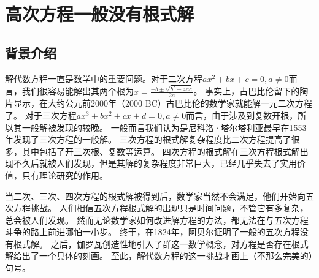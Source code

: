 \documentclass[main]{subfiles}
\begin{document}
\renewcommand{\filename}{No.9Theorem}%
\section{高次方程一般没有根式解}
\subsection{背景介绍}
解代数方程一直是数学中的重要问题。对于二次方程\(ax^2+bx+c=0,a \neq 0\)而言，我们很容易能解出其两个根为\(x= \frac{-b \pm \sqrt{b^2-4ac}}{2a}\)。
事实上，古巴比伦留下的陶片显示，在大约公元前2000年（2000 BC）古巴比伦的数学家就能解一元二次方程了。
对于三次方程\(ax^3+bx^2+cx+d=0,a \neq 0\)而言，由于涉及到复数开根，所以其一般解被发现的较晚。
一般而言我们认为是尼科洛·塔尔塔利亚最早在1553年发现了三次方程的一般解。
三次方程的根式解复杂程度比二次方程提高了很多，其中包括了开三次根、复数等运算。
四次方程的根式解在三次方程根式解出现不久后就被人们发现，但是其解的复杂程度非常巨大，已经几乎失去了实用价值，只有理论研究的作用。

当二次、三次、四次方程的根式解被得到后，数学家当然不会满足，他们开始向五次方程挑战。
人们相信五次方程根式解的出现只是时间问题，不管它有多复杂，总会被人们发现。
然而无论数学家如何改进解方程的方法，都无法在与五次方程斗争的路上前进哪怕一小步。
终于，在1824年，阿贝尔证明了一般的五次方程没有根式解。
之后，伽罗瓦创造性地引入了群这一数学概念，对方程是否存在根式解给出了一个具体的刻画。
至此，解代数方程的这一挑战才画上（不那么完美的）句号。
\end{document}

